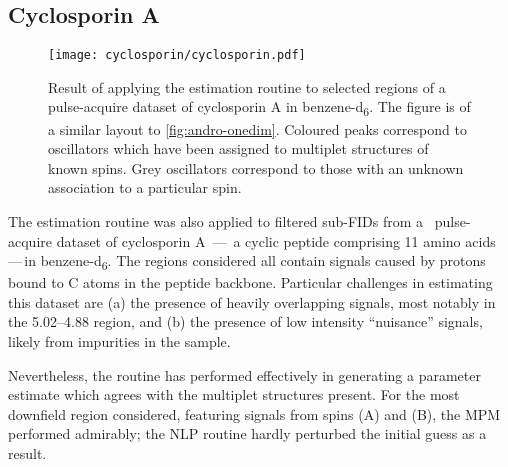 
\subsection{Cyclosporin A}
\begin{figure}
    \texttt{[image: cyclosporin/cyclosporin.pdf]}
    \caption[
        Result of applying the estimation routine to selected regions of a
        pulse-acquire dataset of cyclosporin A.
    ]{
        Result of applying the estimation routine to selected regions of a
        pulse-acquire dataset of cyclosporin A in benzene-d\textsubscript{6}.
        The figure is of a similar layout to \cref{fig:andro-onedim}.
        Coloured peaks correspond to oscillators which have been assigned
        to multiplet structures of known spins. Grey oscillators correspond to
        those with an unknown association to a particular spin.
    }
    \label{fig:cyclosporin}
\end{figure}
The estimation routine was also applied to filtered sub-\acp{FID} from a
\proton\ pulse-acquire dataset of cyclosporin A \,---\, a cyclic peptide comprising 11 amino acids\,---\,in
benzene-d\textsubscript{6}. The regions considered all contain signals caused
by protons bound to C\textsuperscript{\textalpha} atoms in the peptide
backbone\cite{Verma2018}.
Particular challenges in estimating this dataset are (a) the presence of
heavily overlapping signals, most notably in the
\SIrange{5.02}{4.88}{\partspermillion} region, and (b) the presence of low
intensity ``nuisance'' signals, likely from impurities in the sample.

Nevertheless, the routine has performed effectively in generating a parameter
estimate which agrees with the multiplet structures present. For the most
downfield region considered, featuring signals from spins (A) and (B), the
\ac{MPM} performed admirably; the \ac{NLP} routine hardly perturbed the initial
guess as a result.


